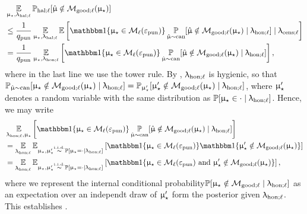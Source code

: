 \begin{align*}
&\Expop_{\modst,\ledhall}\Prhall[\modvarhat \notin \modgoodl(\modst)]  \\
&\le\frac{1}{\qpunish}\Expop_{\modst,\ledhall}\Expop \left[\ind\{\modst \in \modclass_{\ell}(\epspunish)\}\Prmucan[\modvarhat \notin \modgoodl(\modst)\mid \ledhonl] \mid \ledcensl\right]\\
&= \frac{1}{\qpunish}\Expop_{\modst,\ledhonl} \left[\ind\{\modst \in \modclass_{\ell}(\epspunish)\}\Prmucan[\modvarhat \notin \modgoodl(\modst) \mid \ledhonl]\right],
\end{align*}
where in the last line we use the tower rule. By , $\uplambda_{\mathrm{hon};\ell}$ is hygienic, so that $\Prmucan[\modst \notin \modgoodl(\modst) \mid \ledhonl] = \Prop_{\modst'}[ \modst' \notin \modgoodl(\modst) \mid \ledhonl]$, where $\upmu_{\star}'$ denotes a random variable with the same distribution as $\Prop[\modst \in \cdot \mid \ledhonl]$.   Hence, we may write
\begin{align*}
&\Expop_{\ledhonl, \modst} \left[\ind\{\modst \in \modclass_{\ell}(\epspunish)\}\Prmucan[\modvarhat \notin \modgoodl(\modst) \mid \ledhonl]\right] \\
&= \Expop_{\ledhonl}\Exp_{\modst, \modst' \iidsim  \Pr[\modst = \cdot \mid \ledhonl] } \left[\ind\{\modst \in \modclass_{\ell}(\epspunish)\}\ind\{\modst' \notin \modgoodl(\modst)\}\right]\\
&= \Expop_{\ledhonl}\Exp_{\modst, \modst' \iidsim  \Pr[\modst = \cdot \mid \ledhonl] } \left[\ind\{\modst \in \modclass_{\ell}(\epspunish) \text{ and } \modst' \notin \modgoodl(\modst) \}\right],
\end{align*}
where we represent the internal conditional probability$\operatorname{\mathbb{P}}[\upmu_{\star} \notin \mathcal{M}_{\mathrm{good};\ell} \mid \uplambda_{\mathrm{hon};\ell}]$ as an expectation over an independt draw of $\upmu_{\star}'$ form the posterior given $\uplambda_{\mathrm{hon};\ell}$. This establishes .


